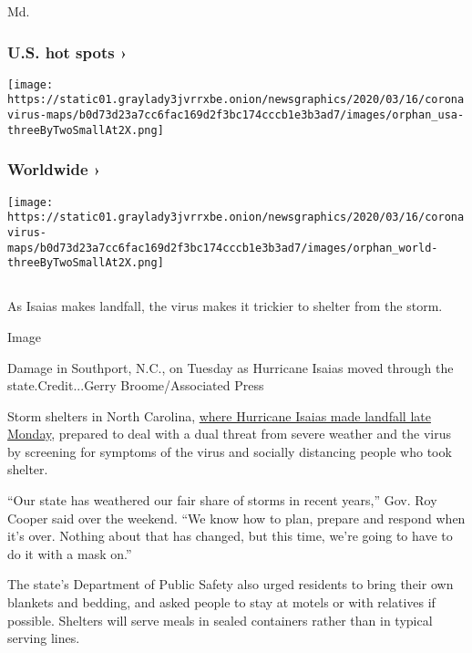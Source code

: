 Md.

\href{https://www.nytimes3xbfgragh.onion/interactive/2020/us/coronavirus-us-cases.html}{}

\hypertarget{us-hot-spots-}{%
\subsubsection{U.S. hot spots ›}\label{us-hot-spots-}}

\texttt{[image: https://static01.graylady3jvrrxbe.onion/newsgraphics/2020/03/16/coronavirus-maps/b0d73d23a7cc6fac169d2f3bc174cccb1e3b3ad7/images/orphan\_usa-threeByTwoSmallAt2X.png]}
\href{https://www.nytimes3xbfgragh.onion/interactive/2020/world/coronavirus-maps.html}{}

\hypertarget{worldwide-}{%
\subsubsection{Worldwide ›}\label{worldwide-}}

\texttt{[image: https://static01.graylady3jvrrxbe.onion/newsgraphics/2020/03/16/coronavirus-maps/b0d73d23a7cc6fac169d2f3bc174cccb1e3b3ad7/images/orphan\_world-threeByTwoSmallAt2X.png]}

\hypertarget{-3}{%
\subsection{}\label{-3}}

As Isaias makes landfall, the virus makes it trickier to shelter from
the storm.

Image

 Damage in Southport, N.C., on Tuesday as Hurricane Isaias moved through
the state.Credit...Gerry Broome/Associated Press

Storm shelters in North Carolina,
\href{https://www.nytimes3xbfgragh.onion/2020/08/04/us/isaias-storm-updates.html}{where
Hurricane Isaias made landfall late Monday}, prepared to deal with a
dual threat from severe weather and the virus by screening for symptoms
of the virus and socially distancing people who took shelter.

``Our state has weathered our fair share of storms in recent years,''
Gov. Roy Cooper said over the weekend. ``We know how to plan, prepare
and respond when it's over. Nothing about that has changed, but this
time, we're going to have to do it with a mask on.''

The state's Department of Public Safety also urged residents to bring
their own blankets and bedding, and asked people to stay at motels or
with relatives if possible. Shelters will serve meals in sealed
containers rather than in typical serving lines.


